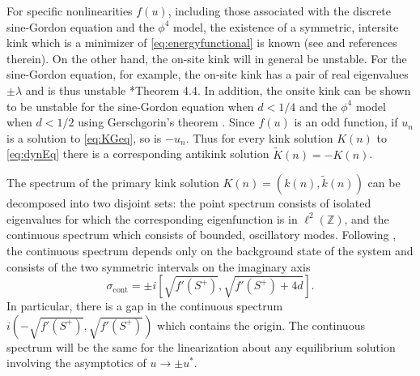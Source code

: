 \documentclass[12pt,reqno]{amsart}
\def\Z{{\mathbb Z}}
\begin{document}
For specific nonlinearities $f(u)$, including those associated with the discrete sine-Gordon equation and the $\phi^4$ model, the existence of a symmetric, intersite kink which is a minimizer of \cref{eq:energyfunctional} is known (see \cites{KevrekidisWeinstein2000,SGchapter} and references therein). On the other
hand, the on-site kink will in general be unstable. For the sine-Gordon equation, for example, the on-site kink has a pair of real eigenvalues $\pm \lambda$ and is thus unstable \cite{Kapitula2001}*{Theorem 4.4}. In addition, the onsite kink can be shown to be unstable for the sine-Gordon equation when $d < 1/4$ and the  $\phi^4$ model when $d < 1/2$ using Gerschgorin’s theorem \cite{SGchapter}. Since $f(u)$ is an odd function, if $u_n$ is a solution to \cref{eq:KGeq}, so is $-u_n$. Thus for every kink solution $K(n)$ to \cref{eq:dynEq} there is a corresponding antikink solution $\tilde{K}(n) = -K(n)$.

The spectrum of the primary kink solution $K(n) = (k(n),\tilde{k}(n))$ can be decomposed into two disjoint sets: the point spectrum consists of isolated eigenvalues for which the corresponding eigenfunction is in $\ell^2(\Z)$, and the continuous spectrum which consists of bounded, oscillatory modes. Following \cite{KevrekidisWeinstein2000}, the continuous spectrum depends only on the background state of the system and consists of the two symmetric intervals on the imaginary axis
\begin{equation}\label{eq:contspec}
	\sigma_{\text{cont}} = \pm i \left[\sqrt{f'(S^+)}, \sqrt{f'(S^+) + 4d}\right].
\end{equation}
In particular, there is a gap in the continuous spectrum $i\left(-\sqrt{f'(S^+)},\sqrt{f'(S^+)}\right)$ which contains the origin. The continuous spectrum will be the same for the linearization about any equilibrium solution involving the asymptotics of $u \rightarrow \pm u^*$.
\end{document}
